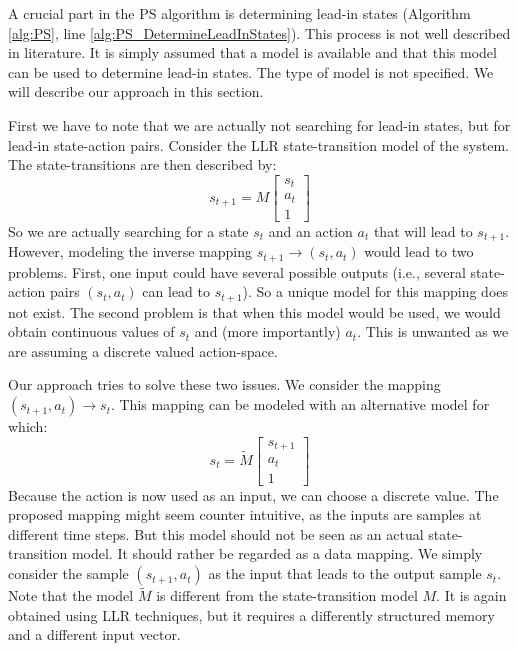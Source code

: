 A crucial part in the \ac{PS} algorithm is determining lead-in states (Algorithm \ref{alg:PS}, line \ref{alg:PS_DetermineLeadInStates}). This process is not well described in literature. It is simply assumed that a model is available and that this model can be used to determine lead-in states. The type of model is not specified. We will describe our approach in this section.

First we have to note that we are actually not searching for lead-in states, but for lead-in state-action pairs. Consider the \ac{LLR} state-transition model  of the system. The state-transitions are then described by:
$$
	s_{t+1} = M \left[\begin{array}{c} s_t \\ a_t \\ 1 \end{array}\right]
$$
So we are actually searching for a state $s_t$ and an action $a_t$ that will lead to $s_{t+1}$. However, modeling the inverse mapping $s_{t+1}\rightarrow(s_t,a_t)$ would lead to two problems. First, one input could have several possible outputs (i.e., several state-action pairs $(s_t,a_t)$ can lead to $s_{t+1}$). So a unique model for this mapping does not exist. The second problem is that when this model would be used, we would obtain continuous values of $s_t$ and (more importantly) $a_t$. This is unwanted as we are assuming a discrete valued action-space.

Our approach tries to solve these two issues. We consider the mapping $(s_{t+1},a_t)\rightarrow s_t$. This mapping can be modeled with an alternative model  for which:
$$
	 s_t  = \tilde{M} \left[\begin{array}{c} s_{t+1} \\ a_t \\ 1 \end{array}\right]
$$
Because the action is now used as an input, we can choose a discrete value. The proposed mapping might seem counter intuitive, as the inputs are samples at different time steps. But this model should not be seen as an actual state-transition model. It should rather be regarded as a data mapping. We simply consider the sample $(s_{t+1}, a_t)$ as the input that leads to the output sample $s_t$. Note that the model $\tilde{M}$ is different from the state-transition model $M$. It is again obtained using \ac{LLR} techniques, but it requires a differently structured memory and a different input vector.

